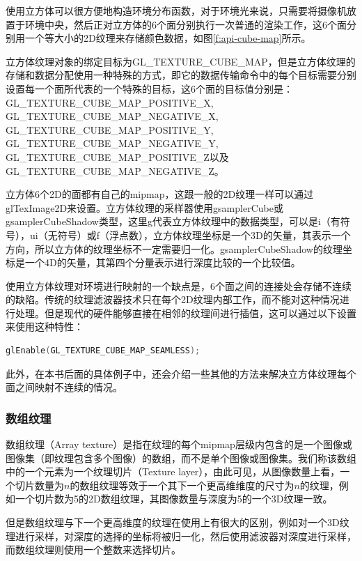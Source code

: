 使用立方体可以很方便地构造环境分布函数，对于环境光来说，只需要将摄像机放置于环境中央，然后正对立方体的6个面分别执行一次普通的渲染工作，这6个面分别用一个等大小的2D纹理来存储颜色数据，如图\ref{f:api-cube-map}所示。

立方体纹理对象的绑定目标为GL\_TEXTURE\_CUBE\_MAP，但是立方体纹理的存储和数据分配使用一种特殊的方式，即它的数据传输命令中的每个目标需要分别设置每一个面所代表的一个特殊的目标，这6个面的目标值分别是：GL\_TEXTURE\_CUBE\_MAP\_POSITIVE\_X, GL\_TEXTURE\_CUBE\_MAP\_NEGATIVE\_X, GL\_TEXTURE\_CUBE\_MAP\_POSITIVE\_Y, GL\_TEXTURE\_CUBE\_MAP\_NEGATIVE\_Y, GL\_TEXTURE\_CUBE\_MAP\_POSITIVE\_Z以及 GL\_TEXTURE\_CUBE\_MAP\_NEGATIVE\_Z。

立方体6个2D的面都有自己的mipmap，这跟一般的2D纹理一样可以通过glTexImage2D来设置。立方体纹理的采样器使用gsamplerCube或gsamplerCubeShadow类型，这里g代表立方体纹理中的数据类型，可以是i（有符号），ui（无符号）或f（浮点数），立方体纹理坐标是一个3D的矢量，其表示一个方向，所以立方体的纹理坐标不一定需要归一化。gsamplerCubeShadow的纹理坐标是一个4D的矢量，其第四个分量表示进行深度比较的一个比较值。

使用立方体纹理对环境进行映射的一个缺点是，6个面之间的连接处会存储不连续的缺陷。传统的纹理滤波器技术只在每个2D纹理内部工作，而不能对这种情况进行处理。但是现代的硬件能够直接在相邻的纹理间进行插值，这可以通过以下设置来使用这种特性：

\begin{lstlisting}[language=C++]
glEnable(GL_TEXTURE_CUBE_MAP_SEAMLESS)​;
\end{lstlisting}

此外，在本书后面的具体例子中，还会介绍一些其他的方法来解决立方体纹理每个面之间映射不连续的情况。
 




\subsubsection{数组纹理}
数组纹理（Array texture）是指在纹理的每个mipmap层级内包含的是一个图像或图像集（即纹理包含多个图像）的数组，而不是单个图像或图像集。我们称该数组中的一个元素为一个纹理切片（Texture layer），由此可见，从图像数量上看，一个切片数量为$n$的数组纹理等效于一个其下一个更高维维度的尺寸为$n$的纹理，例如一个切片数为5的2D数组纹理，其图像数量与深度为5的一个3D纹理一致。

但是数组纹理与下一个更高维度的纹理在使用上有很大的区别，例如对一个3D纹理进行采样，对深度的选择的坐标将被归一化，然后使用滤波器对深度进行采样，而数组纹理则使用一个整数来选择切片。

